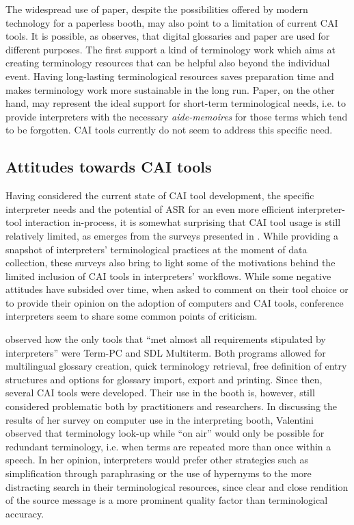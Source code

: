 The widespread use of paper, despite the possibilities offered by modern technology for a paperless booth, may also point to a limitation of current CAI tools. It is possible, as \citet[77]{wagener2012vorbereitende} observes, that digital glossaries and paper are used for different purposes. The first support a kind of terminology work which aims at creating terminology resources that can be helpful also beyond the individual event. Having long-lasting terminological resources saves preparation time and makes terminology work more sustainable in the long run. Paper, on the other hand, may represent the ideal support for short-term terminological needs, i.e. to provide interpreters with the necessary \textit{aide-memoires} for those terms which tend to be forgotten. CAI tools currently do not seem to address this specific need.

\subsection{Attitudes towards CAI tools} \label{CAI_attitudes}
Having considered the current state of CAI tool development, the specific interpreter needs and the potential of ASR for an even more efficient interpreter-tool interaction in-process, it is somewhat surprising that CAI tool usage is still relatively limited, as emerges from the surveys presented in . While providing a snapshot of interpreters' terminological practices at the moment of data collection, these surveys also bring to light some of the motivations behind the limited inclusion of CAI tools in interpreters' workflows. While some negative attitudes have subsided over time, when asked to comment on their tool choice or to provide their opinion on the adoption of computers and CAI tools, conference interpreters seem to share some common points of criticism.

\citet[512]{moser-mercer_banking_1992} observed how the only tools that ``met almost all requirements stipulated by interpreters'' were Term-PC and SDL Multiterm. Both programs allowed for multilingual glossary creation, quick terminology retrieval, free definition of entry structures and options for glossary import, export and printing. Since then, several CAI tools were developed. Their use in the booth is, however, still considered problematic both by practitioners and researchers. In discussing the results of her survey on computer use in the interpreting booth, Valentini observed that terminology look-up while ``on air'' would only be possible for redundant terminology, i.e. when terms are repeated more than once within a speech. In her opinion, interpreters would prefer other strategies such as simplification through paraphrasing or the use of hypernyms to the more distracting search in their terminological resources, since clear and close rendition of the source message is a more prominent quality factor than terminological accuracy.

